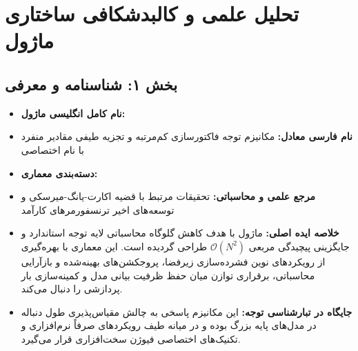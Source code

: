 \section{تحلیل علمی و کالبدشکافی ساختاری ماژول }

\subsection*{بخش ۱: شناسنامه و معرفی }
\begin{itemize}
    \item \textbf{نام کامل انگلیسی ماژول:} 
    \item \textbf{نام فارسی معادل:} مکانیزم توجه فاکتورسازی کم‌مرتبه و تجزیه طیفی مقادیر منفرد با نام اختصاصی 
    \item \textbf{دسته‌بندی معماری:} 
    \item \textbf{مرجع علمی و محاسباتی:} تحقیقات مرتبط با قضیه اکارت-یانگ-میرسکی  و توسعه‌های اخیر ترنسفورمرهای کارآمد
    \item \textbf{خلاصه ایده اصلی:} ماژول  با هدف کاهش گلوگاه محاسباتی لایه توجه استاندارد و جایگزینی پیچیدگی مربعی $\mathcal{O}(N^2)$ طراحی گردیده است. این معماری با بهره‌گیری از رویکردهای نوین فشرده‌سازی زیرفضا، پروجکشن‌های بهینه‌شده و بازآرایی محاسباتی، برقراری توازن میان حفظ ظرفیت بیانی مدل و کمینه‌سازی بار پردازشی را دنبال می‌کند.
    \item \textbf{جایگاه در تبارشناسی توجه:} این مکانیزم پاسخی به چالش مقیاس‌پذیری طول دنباله در مدل‌های پایه بزرگ بوده و در میانه طیف رویکردهای صرفاً نرم‌افزاری و تکنیک‌های اختصاصی فیوژن سخت‌افزاری قرار می‌گیرد.
\end{itemize}

